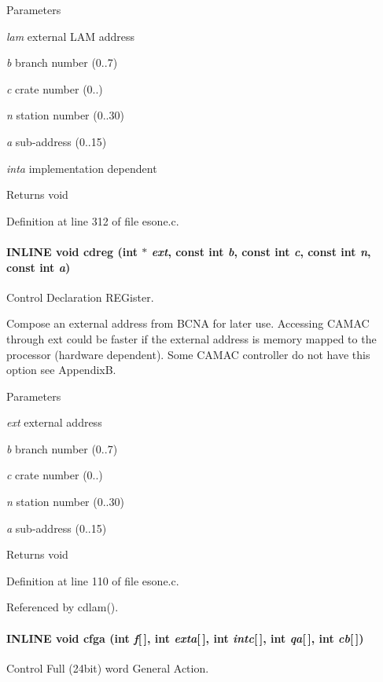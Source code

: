 \begin{DoxyParams}{Parameters}
\item[{\em lam}]external LAM address \item[{\em b}]branch number (0..7) \item[{\em c}]crate number (0..) \item[{\em n}]station number (0..30) \item[{\em a}]sub-\/address (0..15) \item[{\em inta}]implementation dependent \end{DoxyParams}
\begin{DoxyReturn}{Returns}
void 
\end{DoxyReturn}


Definition at line 312 of file esone.c.
\paragraph[{cdreg}]{\setlength{\rightskip}{0pt plus 5cm}INLINE void cdreg (int $\ast$ {\em ext}, \/  const int {\em b}, \/  const int {\em c}, \/  const int {\em n}, \/  const int {\em a})}\hfill\label{esone_8c_aaffe7c02487145ee9176798f48d077ed}
Control Declaration REGister.

Compose an external address from BCNA for later use. Accessing CAMAC through ext could be faster if the external address is memory mapped to the processor (hardware dependent). Some CAMAC controller do not have this option see AppendixB. 
\begin{DoxyParams}{Parameters}
\item[{\em ext}]external address \item[{\em b}]branch number (0..7) \item[{\em c}]crate number (0..) \item[{\em n}]station number (0..30) \item[{\em a}]sub-\/address (0..15) \end{DoxyParams}
\begin{DoxyReturn}{Returns}
void 
\end{DoxyReturn}


Definition at line 110 of file esone.c.

Referenced by cdlam().
\paragraph[{cfga}]{\setlength{\rightskip}{0pt plus 5cm}INLINE void cfga (int {\em f}\mbox{[}$\,$\mbox{]}, \/  int {\em exta}\mbox{[}$\,$\mbox{]}, \/  int {\em intc}\mbox{[}$\,$\mbox{]}, \/  int {\em qa}\mbox{[}$\,$\mbox{]}, \/  int {\em cb}\mbox{[}$\,$\mbox{]})}\hfill\label{esone_8c_ac2213e15aee8fa9269c4082abb1f9df9}
Control Full (24bit) word General Action.


